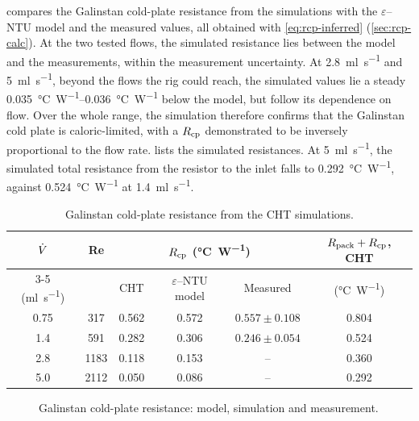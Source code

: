  compares the Galinstan cold-plate resistance from
the simulations with the $\varepsilon$--NTU model and the measured values, all
obtained with \cref{eq:rcp-inferred} (\cref{sec:rcp-calc}). At the two tested
flows, the simulated resistance lies between the model and the measurements,
within the measurement uncertainty.
At \SI{2.8}{\milli\litre\per\second} and \SI{5}{\milli\litre\per\second},
beyond the flows the rig could reach, the simulated values lie a steady
\SIrange{0.035}{0.036}{\celsius\per\watt} below the model, but follow its
dependence on flow. Over the whole range, the simulation therefore confirms that
the Galinstan cold plate is caloric-limited, with a $R_{\mathrm{cp}}$ demonstrated to be inversely proportional
to the flow rate.  lists the simulated resistances. At
\SI{5}{\milli\litre\per\second}, the simulated total resistance from the resistor
to the inlet falls to \SI{0.292}{\celsius\per\watt}, against
\SI{0.524}{\celsius\per\watt} at \SI{1.4}{\milli\litre\per\second}.

\begin{table}[htbp]
  \centering
  \caption{Galinstan cold-plate resistance from the CHT simulations.}
  \label{tab:cht-rcp}
  \small
  \begin{tabular}{@{}cccccc@{}}
    \toprule
    $\dot{V}$ & Re & \multicolumn{3}{c}{$R_{\mathrm{cp}}$ (\si{\celsius\per\watt})}
      & $R_{\mathrm{pack}} + R_{\mathrm{cp}}$, CHT \\
    \cmidrule(lr){3-5}
    (\si{\milli\litre\per\second}) & & CHT & $\varepsilon$--NTU model & Measured
      & (\si{\celsius\per\watt}) \\
    \midrule
    0.75 & 317  & 0.562 & 0.572 & $0.557 \pm 0.108$\tnote{a} & 0.804 \\
    1.4  & 591  & 0.282 & 0.306 & $0.246 \pm 0.054$\tnote{a} & 0.524 \\
    2.8  & 1183 & 0.118 & 0.153 & --                         & 0.360 \\
    5.0  & 2112 & 0.050 & 0.086 & --                         & 0.292 \\
    \bottomrule
  \end{tabular}
\end{table}

\begin{figure}[htbp]
  \centering
  
  \caption{Galinstan cold-plate resistance: model, simulation and measurement.}
  \label{fig:galinstan_rcp_cfd}
\end{figure}
